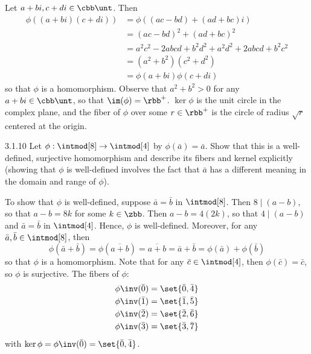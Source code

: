 \begin{sol}
    Let $a + bi, c + di \in \cbb\unt$.
	Then
    \begin{align*}
        \phi((a + bi)(c + di)) & = \phi((ac - bd) + (ad + bc)i) \\
        & = (ac - bd)^2 + (ad + bc)^2 \\
        & = a^2c^2 - 2abcd + b^2d^2 + a^2d^2 + 2abcd + b^2c^2 \\
        & = (a^2 + b^2)(c^2 + d^2) \\
        & = \phi(a + bi)\phi(c + di)
    \end{align*}
    so that $\phi$ is a homomorphism.
	Observe that $a^2 + b^2 > 0$ for any $a + bi \in \cbb\unt$, so that $\im(\phi) = \rbb^+$. $\ker\phi$ is the unit circle in the complex plane, and the fiber of $\phi$ over some $r \in \rbb^+$ is the circle of radius $\sqrt r$ centered at the origin.
\end{sol}

\begin{exercise}{3.1.10}
    Let $\phi : \intmod[8] \to \intmod[4]$ by $\phi(\bar  a) = \bar  a$.
	Show that this is a well-defined, surjective homomorphism and describe its fibers and kernel explicitly (showing that $\phi$ is well-defined involves the fact that $\bar  a$ has a different meaning in the domain and range of $\phi$).
\end{exercise}

\begin{sol}
    To show that $\phi$ is well-defined, suppose $\bar a = \bar b$ in $\intmod[8]$.
	Then $8 \mid (a - b)$, so that $a - b = 8k$ for some $k \in \zbb$.
	Then $a - b = 4(2k)$, so that $4 \mid (a - b)$ and $\bar a = \bar b$ in $\intmod[4]$.
	Hence, $\phi$ is well-defined.
	Moreover, for any $\bar a, \bar b \in \intmod[8]$, then
    \[
    	\phi(\bar a + \bar b) = \phi(\overline{a + b}) = \overline{a + b} = \bar a + \bar b = \phi(\bar a) + \phi(\bar b)
    \]
    so that $\phi$ is a homomorphism.
	Note that for any $\bar c \in \intmod[4]$, then $\phi(\bar c) = \bar c$, so $\phi$ is surjective.
	The fibers of $\phi$:
    \begin{align*}
        \phi\inv(\bar 0) & = \set{\bar 0, \bar 4} \\
        \phi\inv(\bar 1) & = \set{\bar 1, \bar 5} \\
        \phi\inv(\bar 2) & = \set{\bar 2, \bar 6} \\
        \phi\inv(\bar 3) & = \set{\bar 3, \bar 7}
    \end{align*}
    with $\ker\phi = \phi\inv(\bar 0) = \set{\bar 0, \bar 4}$.
\end{sol}

